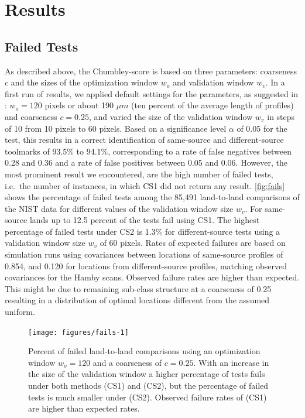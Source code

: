 \documentclass[12pt]{article}
\begin{document}
\hypertarget{results}{%
\section{Results}\label{results}}

\hypertarget{failed-tests}{%
\subsection{Failed Tests}\label{failed-tests}}

As described above, the Chumbley-score is based on three parameters:
coarseness \(c\) and the sizes of the optimization window \(w_o\) and
validation window \(w_v\). In a first run of results, we applied default
settings for the parameters, as suggested in \citet{hadler}:
\(w_o = 120\) pixels or about 190 \(\mu m\) (ten percent of the average
length of profiles) and coarseness \(c = 0.25\), and varied the size of
the validation window \(w_v\) in steps of 10 from 10 pixels to 60
pixels. Based on a significance level \(\alpha\) of 0.05 for the test,
this results in a correct identification of same-source and
different-source toolmarks of 93.5\% to 94.1\%, corresponding to a rate
of false negatives between 0.28 and 0.36 and a rate of false positives
between 0.05 and 0.06. However, the most prominent result we
encountered, are the high number of failed tests, i.e.~the number of
instances, in which CS1 did not return any result. \autoref{fig:fails}
shows the percentage of failed tests among the 85,491 land-to-land
comparisons of the NIST data for different values of the validation
window size \(w_v\). For same-source lands up to 12.5 percent of the
tests fail using CS1. The highest percentage of failed tests under CS2
is 1.3\% for different-source tests using a validation window size
\(w_v\) of 60 pixels. Rates of expected failures are based on simulation
runs using covariances between locations of same-source profiles of
0.854, and 0.120 for locations from different-source profiles, matching
observed covariances for the Hamby scans. Observed failure rates are
higher than expected. This might be due to remaining sub-class structure
at a coarseness of 0.25 resulting in a distribution of optimal locations
different from the assumed uniform.

\begin{figure}

{\centering \texttt{[image: figures/fails-1]} 

}

\caption{Percent of failed land-to-land comparisons using an optimization window $w_o = 120$ and a coarseness of $c = 0.25$. With an increase in the size of the validation window  a higher percentage of tests fails under both methods (CS1) and (CS2), but the percentage of failed tests is much smaller under (CS2). Observed failure rates of (CS1) are higher than expected rates.}\label{fig:fails}
\end{figure}
\end{document}
